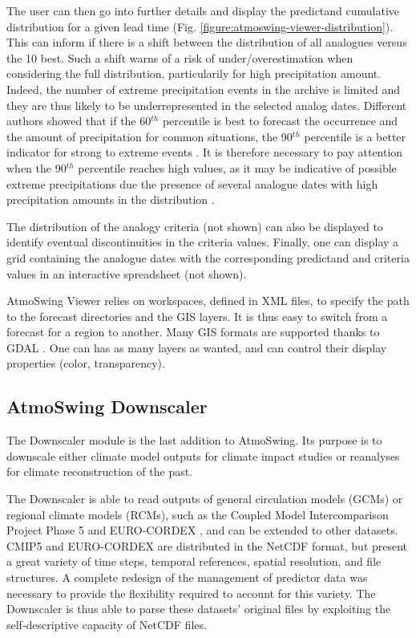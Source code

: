 \documentclass[review]{elsarticle}
\begin{document}
The user can then go into further details and display the predictand cumulative distribution for a given lead time (Fig. \ref{figure:atmoswing-viewer-distribution}). This can inform if there is a shift between the distribution of all analogues versus the 10 best. Such a shift warns of a risk of under/overestimation when considering the full distribution, particularily for high precipitation amount. Indeed, the number of extreme precipitation events in the archive is limited and they are thus likely to be underrepresented in the selected analog dates. Different authors showed that if the 60$^{th}$ percentile is best to forecast the occurrence and the amount of precipitation for common situations, the 90$^{th}$ percentile is a better indicator for strong to extreme events \citep{Djerboua2001, Bontron2004, Marty2010}. It is therefore necessary to pay attention when the 90$^{th}$ percentile reaches high values, as it may be indicative of possible extreme precipitations due the presence of several analogue dates with high precipitation amounts in the distribution \citep{Djerboua2001}.

The distribution of the analogy criteria (not shown) can also be displayed to identify eventual discontinuities in the criteria values. Finally, one can display a grid containing the analogue dates with the corresponding predictand and criteria values in an interactive spreadsheet (not shown).

AtmoSwing Viewer relies on workspaces, defined in XML files, to specify the path to the forecast directories and the GIS layers. It is thus easy to switch from a forecast for a region to another. Many GIS formats are supported thanks to GDAL \cite[Geospatial Data Abstraction Library,][]{GDAL2014}. One can has as many layers as wanted, and can control their display properties (color, transparency).


\subsection{AtmoSwing Downscaler}
\label{sec:downscaler}

The Downscaler module is the last addition to AtmoSwing. Its purpose is to downscale either climate model outputs for climate impact studies or reanalyses for climate reconstruction of the past. 

The Downscaler is able to read outputs of general circulation models (GCMs) or regional climate models (RCMs), such as the Coupled Model Intercomparison Project Phase 5 \citep[CMIP5,][]{Taylor2012} and EURO-CORDEX \citep{Jacob2014}, and can be extended to other datasets. CMIP5 and EURO-CORDEX are distributed in the NetCDF format, but present a great variety of time steps, temporal references, spatial resolution, and file structures. A complete redesign of the management of predictor data was necessary to provide the flexibility required to account for this variety. The Downscaler is thus able to parse these datasets' original files by exploiting the self-descriptive capacity of NetCDF files.
\end{document}
